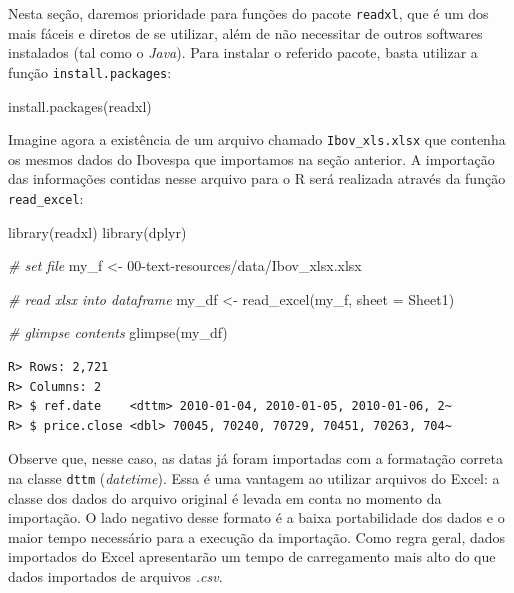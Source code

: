 \documentclass[
  11pt,
]{book}
\newenvironment{Shaded}{\begin{snugshade}}{\end{snugshade}}
\newcommand{\AttributeTok}[1]{\textcolor[rgb]{0.61,0.61,0.61}{#1}}
\newcommand{\CommentTok}[1]{\textcolor[rgb]{0.37,0.37,0.37}{\textit{#1}}}
\newcommand{\FunctionTok}[1]{\textcolor[rgb]{0,0,0}{#1}}
\newcommand{\NormalTok}[1]{#1}
\newcommand{\OtherTok}[1]{\textcolor[rgb]{0.37,0.37,0.37}{#1}}
\newcommand{\StringTok}[1]{\textcolor[rgb]{0.5,0.5,0.5}{#1}}
\begin{document}
Nesta seção, daremos prioridade para funções do pacote \texttt{readxl}, que é um dos mais fáceis e diretos de se utilizar, além de não necessitar de outros softwares instalados (tal como o \emph{Java}). Para instalar o referido pacote, basta utilizar a função \texttt{install.packages}: 

\begin{Shaded}
\begin{Highlighting}[]
\FunctionTok{install.packages}\NormalTok{(}\StringTok{\textquotesingle{}readxl\textquotesingle{}}\NormalTok{)}
\end{Highlighting}
\end{Shaded}

Imagine agora a existência de um arquivo chamado \texttt{Ibov\_xls.xlsx} que contenha os mesmos dados do Ibovespa que importamos na seção anterior. A importação das informações contidas nesse arquivo para o R será realizada através da função \texttt{read\_excel}: 

\begin{Shaded}
\begin{Highlighting}[]
\FunctionTok{library}\NormalTok{(readxl)}
\FunctionTok{library}\NormalTok{(dplyr)}

\CommentTok{\# set file}
\NormalTok{my\_f }\OtherTok{\textless{}{-}} \StringTok{\textquotesingle{}00{-}text{-}resources/data/Ibov\_xlsx.xlsx\textquotesingle{}}

\CommentTok{\# read xlsx into dataframe}
\NormalTok{my\_df }\OtherTok{\textless{}{-}} \FunctionTok{read\_excel}\NormalTok{(my\_f, }\AttributeTok{sheet =} \StringTok{\textquotesingle{}Sheet1\textquotesingle{}}\NormalTok{)}

\CommentTok{\# glimpse contents}
\FunctionTok{glimpse}\NormalTok{(my\_df)}
\end{Highlighting}
\end{Shaded}

\begin{verbatim}
R> Rows: 2,721
R> Columns: 2
R> $ ref.date    <dttm> 2010-01-04, 2010-01-05, 2010-01-06, 2~
R> $ price.close <dbl> 70045, 70240, 70729, 70451, 70263, 704~
\end{verbatim}

Observe que, nesse caso, as datas já foram importadas com a formatação correta na classe \texttt{dttm} (\emph{datetime}). Essa é uma vantagem ao utilizar arquivos do Excel: a classe dos dados do arquivo original é levada em conta no momento da importação. O lado negativo desse formato é a baixa portabilidade dos dados e o maior tempo necessário para a execução da importação. Como regra geral, dados importados do Excel apresentarão um tempo de carregamento mais alto do que dados importados de arquivos \emph{.csv}.
\end{document}
